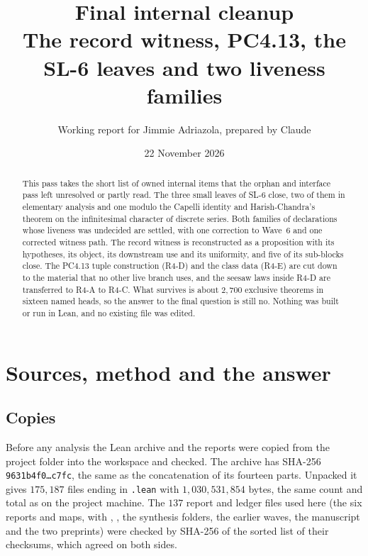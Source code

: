 \documentclass[11pt]{article}
\title{Final internal cleanup\\ The record witness, PC4.13, the SL-6 leaves and two liveness families}
\author{Working report for Jimmie Adriazola, prepared by Claude}
\date{22 November 2026}
\newcommand{\SL}[1]{\textsf{SL-#1}}
\theoremstyle{remark}
\begin{document}
\maketitle

\begin{abstract}
This pass takes the short list of owned internal items that the orphan and interface pass left unresolved or partly read. The three small leaves of \SL{6} close, two of them in elementary analysis and one modulo the Capelli identity and Harish-Chandra's theorem on the infinitesimal character of discrete series. Both families of declarations whose liveness was undecided are settled, with one correction to Wave~6 and one corrected witness path. The record witness  is reconstructed as a proposition with its hypotheses, its object, its downstream use and its uniformity, and five of its sub-blocks close. The PC4.13 tuple construction (R4-D) and the class data (R4-E) are cut down to the material that no other live branch uses, and the seesaw laws inside R4-D are transferred to R4-A to R4-C. What survives is about $2{,}700$ exclusive theorems in sixteen named heads, so the answer to the final question is still no. Nothing was built or run in Lean, and no existing file was edited.
\end{abstract}

\tableofcontents

\section{Sources, method and the answer}

\subsection{Copies}

Before any analysis the Lean archive and the reports were copied from the project folder into the workspace and checked. The archive  has SHA-256 \texttt{9631b4f0\ldots c7fc}, the same as the concatenation of its fourteen parts. Unpacked it gives $175{,}187$ files ending in \texttt{.lean} with $1{,}030{,}531{,}854$ bytes, the same count and total as  on the project machine. The $137$ report and ledger files used here (the six  reports and maps,  with , , the synthesis folders, the earlier waves, the manuscript and the two preprints) were checked by SHA-256 of the sorted list of their checksums, which agreed on both sides.
\end{document}
